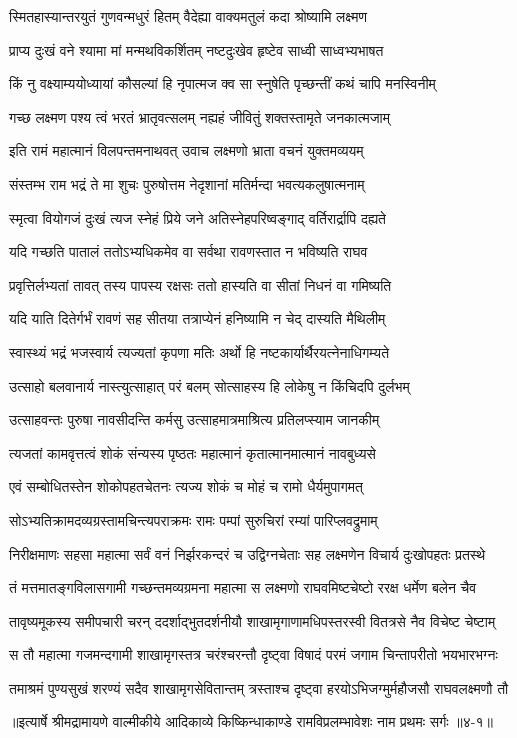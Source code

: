 \twolineshloka
{स्मितहास्यान्तरयुतं गुणवन्मधुरं हितम्}
{वैदेह्या वाक्यमतुलं कदा श्रोष्यामि लक्ष्मण} %

\twolineshloka
{प्राप्य दुःखं वने श्यामा मां मन्मथविकर्शितम्}
{नष्टदुःखेव हृष्टेव साध्वी साध्वभ्यभाषत} %

\twolineshloka
{किं नु वक्ष्याम्ययोध्यायां कौसल्यां हि नृपात्मज}
{क्व सा स्नुषेति पृच्छन्तीं कथं चापि मनस्विनीम्} %

\twolineshloka
{गच्छ लक्ष्मण पश्य त्वं भरतं भ्रातृवत्सलम्}
{नह्यहं जीवितुं शक्तस्तामृते जनकात्मजाम्} %

\twolineshloka
{इति रामं महात्मानं विलपन्तमनाथवत्}
{उवाच लक्ष्मणो भ्राता वचनं युक्तमव्ययम्} %

\twolineshloka
{संस्तम्भ राम भद्रं ते मा शुचः पुरुषोत्तम}
{नेदृशानां मतिर्मन्दा भवत्यकलुषात्मनाम्} %

\twolineshloka
{स्मृत्वा वियोगजं दुःखं त्यज स्नेहं प्रिये जने}
{अतिस्नेहपरिष्वङ्गाद् वर्तिरार्द्रापि दह्यते} %

\twolineshloka
{यदि गच्छति पातालं ततोऽभ्यधिकमेव वा}
{सर्वथा रावणस्तात न भविष्यति राघव} %

\twolineshloka
{प्रवृत्तिर्लभ्यतां तावत् तस्य पापस्य रक्षसः}
{ततो हास्यति वा सीतां निधनं वा गमिष्यति} %

\twolineshloka
{यदि याति दितेर्गर्भं रावणं सह सीतया}
{तत्राप्येनं हनिष्यामि न चेद् दास्यति मैथिलीम्} %

\twolineshloka
{स्वास्थ्यं भद्रं भजस्वार्य त्यज्यतां कृपणा मतिः}
{अर्थो हि नष्टकार्यार्थैरयत्नेनाधिगम्यते} %

\twolineshloka
{उत्साहो बलवानार्य नास्त्युत्साहात् परं बलम्}
{सोत्साहस्य हि लोकेषु न किंचिदपि दुर्लभम्} %

\twolineshloka
{उत्साहवन्तः पुरुषा नावसीदन्ति कर्मसु}
{उत्साहमात्रमाश्रित्य प्रतिलप्स्याम जानकीम्} %

\twolineshloka
{त्यजतां कामवृत्तत्वं शोकं संन्यस्य पृष्ठतः}
{महात्मानं कृतात्मानमात्मानं नावबुध्यसे} %

\twolineshloka
{एवं सम्बोधितस्तेन शोकोपहतचेतनः}
{त्यज्य शोकं च मोहं च रामो धैर्यमुपागमत्} %

\twolineshloka
{सोऽभ्यतिक्रामदव्यग्रस्तामचिन्त्यपराक्रमः}
{रामः पम्पां सुरुचिरां रम्यां पारिप्लवद्रुमाम्} %

\twolineshloka
{निरीक्षमाणः सहसा महात्मा सर्वं वनं निर्झरकन्दरं च}
{उद्विग्नचेताः सह लक्ष्मणेन विचार्य दुःखोपहतः प्रतस्थे} %

\twolineshloka
{तं मत्तमातङ्गविलासगामी गच्छन्तमव्यग्रमना महात्मा}
{स लक्ष्मणो राघवमिष्टचेष्टो ररक्ष धर्मेण बलेन चैव} %

\twolineshloka
{तावृष्यमूकस्य समीपचारी चरन् ददर्शाद्भुतदर्शनीयौ}
{शाखामृगाणामधिपस्तरस्वी वितत्रसे नैव विचेष्ट चेष्टाम्} %

\twolineshloka
{स तौ महात्मा गजमन्दगामी शाखामृगस्तत्र चरंश्चरन्तौ}
{दृष्ट्वा विषादं परमं जगाम चिन्तापरीतो भयभारभग्नः} %

\twolineshloka
{तमाश्रमं पुण्यसुखं शरण्यं सदैव शाखामृगसेवितान्तम्}
{त्रस्ताश्च दृष्ट्वा हरयोऽभिजग्मुर्महौजसौ राघवलक्ष्मणौ तौ} %


॥इत्यार्षे श्रीमद्रामायणे वाल्मीकीये आदिकाव्ये किष्किन्धाकाण्डे रामविप्रलम्भावेशः नाम प्रथमः सर्गः ॥४-१॥

